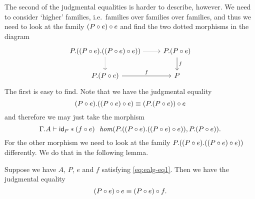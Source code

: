 The second of the judgmental equalities is harder to describe, however. We need
to consider `higher' families, i.e.~families over families over families, and
thus we need to look at the family $\jcomp{}{e}{\jcomp{}{e}{P}}$ and find the
two dotted morphisms in the diagram
\begin{equation*}
\begin{tikzcd}
\ctxext{P}{{\jcomp{}{e}{P}}{\jcomp{}{e}{\jcomp{}{e}{P}}}}
  \ar[densely dotted]{d}
  \ar[densely dotted]{r}
& \ctxext{P}{\jcomp{}{e}{P}} \ar{d}{f}\\
\ctxext{P}{\jcomp{}{e}{P}} \ar{r}{f} & P
\end{tikzcd}
\end{equation*}
The first is easy to find. Note that we have the judgmental equality
\begin{equation*}
\ctxext{\jcomp{}{e}{P}}{\jcomp{}{e}{\jcomp{}{e}{P}}}
  \jdeq
  \jcomp{}{e}{\ctxext{P}{\jcomp{}{e}{P}}}
\end{equation*}
and therefore we may just take the morphism
\begin{equation*}
\jhom
  {{\Gamma}{A}}
  {{P}{{\jcomp{}{e}{P}}{\jcomp{}{e}{\jcomp{}{e}{P}}}}}
  {{P}{\jcomp{}{e}{P}}}
  {\jvcomp{}{\idtm{P}}{\jcomp{}{e}{f}}}.
\end{equation*}
For the other morphism we need to look at the family
$\ctxext{P}{{\jcomp{}{e}{P}}{\jcomp{}{e}{\jcomp{}{e}{P}}}}$ differently. We do
that in the following lemma.

\begin{lem}
Suppose we have $A$, $P$, $e$ and $f$ satisfying \autoref{eq:ealg-eq1}. Then
we have the judgmental equality
\begin{equation*}
\jcomp{}{e}{\jcomp{}{e}{P}}
  \jdeq
  \jcomp{}{f}{\jcomp{}{e}{P}}.
\end{equation*}
\end{lem}

